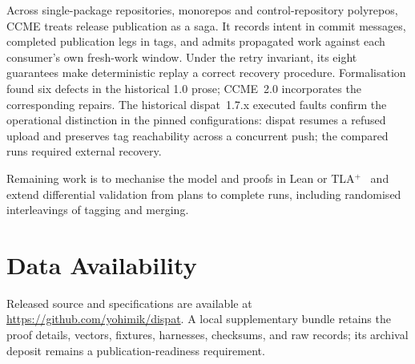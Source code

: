 \documentclass[sigconf,nonacm]{acmart}
\begin{document}
Across single-package repositories, monorepos and control-repository polyrepos,
CCME treats release publication as a saga. It records intent in commit
messages, completed publication legs in tags, and admits propagated work
against each consumer's own fresh-work window. Under the retry invariant, its eight
guarantees make deterministic replay a correct recovery procedure.
Formalisation found six defects in the historical 1.0 prose; CCME~2.0
incorporates the corresponding repairs. The historical dispat~1.7.x executed
faults confirm the operational distinction in the pinned configurations:
dispat resumes a refused upload and preserves tag reachability across a
concurrent push; the compared runs required external recovery.

Remaining work is to mechanise the model and proofs in Lean or
TLA$^{+}$~\cite{lamport} and extend differential validation from plans to
complete runs, including randomised interleavings of tagging and merging.

\section*{Data Availability}

Released source and specifications are available at
\url{https://github.com/yohimik/dispat}. A local supplementary bundle retains
the proof details, vectors, fixtures, harnesses, checksums, and raw records;
its archival deposit remains a publication-readiness requirement.
\end{document}
